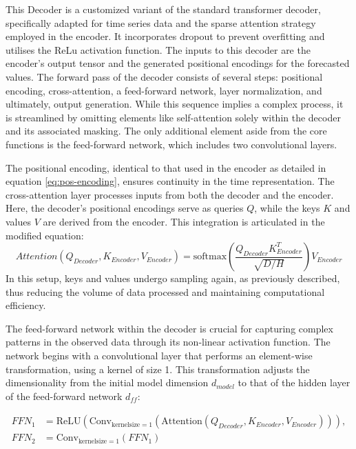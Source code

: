 \documentclass{article}
\begin{document}
This Decoder is a customized variant of the standard transformer decoder, specifically adapted for time series data and the sparse attention strategy employed in the encoder. It incorporates dropout to prevent overfitting and utilises the ReLu activation function. The inputs to this decoder are the encoder's output tensor and the generated positional encodings for the forecasted values. The forward pass of the decoder consists of several steps: positional encoding, cross-attention, a feed-forward network, layer normalization, and ultimately, output generation. While this sequence implies a complex process, it is streamlined by omitting elements like self-attention solely within the decoder and its associated masking. The only additional element aside from the core functions is the feed-forward network, which includes two convolutional layers.

The positional encoding, identical to that used in the encoder as detailed in equation \ref{eq:pos-encoding}, ensures continuity in the time representation. The cross-attention layer processes inputs from both the decoder and the encoder. Here, the decoder's positional encodings serve as queries $Q$, while the keys $K$ and values $V$ are derived from the encoder. This integration is articulated in the modified equation:
\begin{equation}\label{eq:Decoder-CrossAttention}
    Attention(Q_{Decoder}, K_{Encoder}, V_{Encoder}) = \text{softmax} \left( \frac{Q_{Decoder} K_{Encoder}^T}{\sqrt{D / H}} \right) V_{Encoder}
\end{equation}
In this setup, keys and values undergo sampling again, as previously described, thus reducing the volume of data processed and maintaining computational efficiency.

The feed-forward network within the decoder is crucial for capturing complex patterns in the observed data through its non-linear activation function. The network begins with a convolutional layer that performs an element-wise transformation, using a kernel of size 1. This transformation adjusts the dimensionality from the initial model dimension $d_{model}$ to that of the hidden layer of the feed-forward network $d_{ff}$:

\begin{align}
    FFN_1 &= \text{ReLU}(\text{Conv}_{\text{kernelsize} = 1}(\text{Attention}(Q_{Decoder}, K_{Encoder}, V_{Encoder}))), \\
    FFN_2 &= \text{Conv}_{\text{kernelsize} = 1}(FFN_1)
\end{align}
\end{document}
